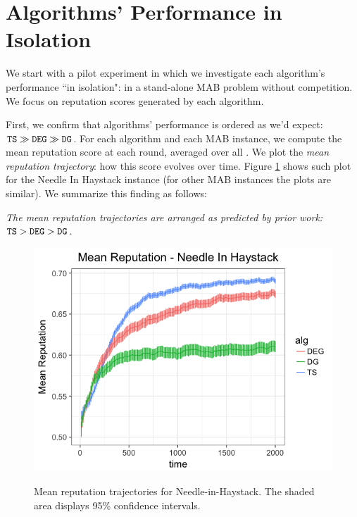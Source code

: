 \documentclass[../competing_bandits.tex]{subfiles}
\begin{document}
\section{Algorithms' Performance in Isolation}\label{section:4}

We start with a pilot experiment in which we investigate each algorithm's performance ``in isolation": in a stand-alone MAB problem without competition. We focus on reputation scores generated by each algorithm.

First, we confirm that algorithms' performance is ordered as we'd expect:
    $\mathtt{TS} \gg \mathtt{DEG} \gg \mathtt{DG}$.
For each algorithm and each MAB instance, we compute the mean reputation score at each round, averaged over all \MRVs. We plot the \emph{mean reputation trajectory}: how this score evolves over time. Figure \ref{prelim_means} shows such plot for the Needle In Haystack instance (for other MAB instances the plots are similar). We summarize this finding as follows:

\begin{finding}
\textit{The mean reputation trajectories  are arranged as predicted by prior work:
    $\mathtt{TS} > \mathtt{DEG} > \mathtt{DG}$.}
\end{finding}


\begin{figure}
\caption{Mean reputation trajectories for Needle-in-Haystack. The shaded area displays 95\% confidence intervals.}
\includegraphics[scale=0.35]{figures/nih_iso_mean}
\label{prelim_means}
\end{figure}
\end{document}
